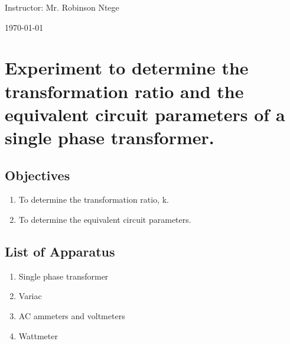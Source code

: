 \documentclass[12pt,a4paper]{report}
\begin{document}
\begin{titlepage}
\begin{center}
       
        \vspace{20pt}

        \normalsize Instructor: Mr. Robinson Ntege\\
        \vspace{10pt}

        \normalsize \today
        \vspace{20pt}

    \end{center}
\end{titlepage}

\tableofcontents
\newpage

\listoffigures
\newpage

\listoftables
\newpage


\chapter{Experiment to determine the transformation ratio and the equivalent circuit parameters of a single phase transformer.}

\section{Objectives}
\begin{enumerate}[label=\roman*.]
    \item To determine the transformation ratio, k.
    \item To determine the equivalent circuit parameters.
\end{enumerate}

\section{List of Apparatus}
\begin{enumerate}[label=\roman*.]
    \item Single phase transformer
    \item Variac
    \item AC ammeters and voltmeters
    \item Wattmeter
\end{enumerate}
\end{document}
